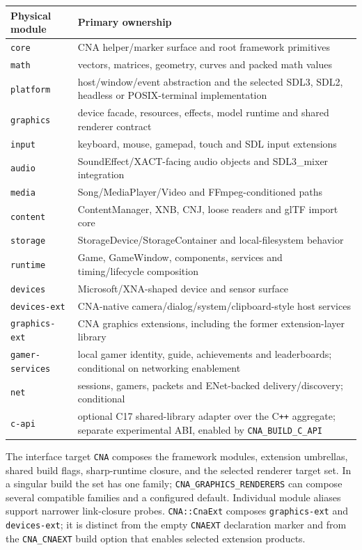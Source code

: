 \begin{center}
\begin{tabular}{p{3.1cm}p{8cm}}
\toprule
\textbf{Physical module} & \textbf{Primary ownership} \\
\midrule
\texttt{core} & CNA helper/marker surface and root framework primitives \\
\texttt{math} & vectors, matrices, geometry, curves and packed math values \\
\texttt{platform} & host/window/event abstraction and the selected SDL3, SDL2, headless or
  POSIX-terminal implementation \\
\texttt{graphics} & device facade, resources, effects, model runtime and shared renderer contract \\
\texttt{input} & keyboard, mouse, gamepad, touch and SDL input extensions \\
\texttt{audio} & SoundEffect/XACT-facing audio objects and SDL3\_mixer integration \\
\texttt{media} & Song/MediaPlayer/Video and FFmpeg-conditioned paths \\
\texttt{content} & ContentManager, XNB, CNJ, loose readers and glTF import core \\
\texttt{storage} & StorageDevice/StorageContainer and local-filesystem behavior \\
\texttt{runtime} & Game, GameWindow, components, services and timing/lifecycle composition \\
\texttt{devices} & Microsoft/XNA-shaped device and sensor surface \\
\texttt{devices-ext} & CNA-native camera/dialog/system/clipboard-style host services \\
\texttt{graphics-ext} & CNA graphics extensions, including the former extension-layer library \\
\texttt{gamer-services} & local gamer identity, guide, achievements and leaderboards; conditional
  on networking enablement \\
\texttt{net} & sessions, gamers, packets and ENet-backed delivery/discovery; conditional \\
\texttt{c-api} & optional C17 shared-library adapter over the C\texttt{++} aggregate; separate
  experimental ABI, enabled by \texttt{CNA\_BUILD\_C\_API} \\
\bottomrule
\end{tabular}
\end{center}

The interface target \texttt{CNA} composes the framework modules, extension umbrellas, shared
build flags, sharp-runtime closure, and the selected renderer target set.  In a singular build
the set has one family; \texttt{CNA\_GRAPHICS\_RENDERERS} can compose several compatible
families and a configured default.  Individual module
aliases support narrower link-closure probes.  \texttt{CNA::CnaExt} composes
\texttt{graphics-ext} and \texttt{devices-ext}; it is distinct from the empty \texttt{CNAEXT}
declaration marker and from the \texttt{CNA\_CNAEXT} build option that enables selected extension
products.

